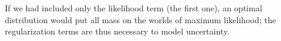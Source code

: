 \documentclass{article}
\theoremstyle{plain}
\theoremstyle{definition}
\theoremstyle{remark}
\newcommand{\todo}[1]{{\color{red}\ \!\Large\smash{\textbf{[}}{\normalsize\textsc{todo:} #1}\ \!\smash{\textbf{]}}}}
\newcommand{\dg}[1]{\mathbdcal{#1}}
\numberwithin{equation}{section}
\begin{document}
\vspace{-1em}
If we had included only the likelihood term (the first one), an
optimal distribution would put all mass on the worlds of maximum
likelihood;
the regularization terms are thus necessary to model uncertainty.
\end{document}
